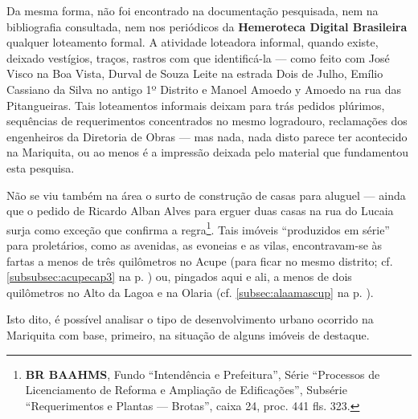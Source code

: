 
Da mesma forma, não foi encontrado na documentação pesquisada, nem na bibliografia consultada, nem nos periódicos da \textbf{Hemeroteca Digital Brasileira} qualquer loteamento formal. A atividade loteadora informal, quando existe, deixado vestígios, traços, rastros com que identificá-la --- como feito com José Visco na Boa Vista, Durval de Souza Leite na estrada Dois de Julho, Emílio Cassiano da Silva no antigo 1º Distrito e Manoel Amoedo y Amoedo na rua das Pitangueiras. Tais loteamentos informais deixam para trás pedidos plúrimos, sequências de requerimentos concentrados no mesmo logradouro, reclamações dos engenheiros da Diretoria de Obras --- mas nada, nada disto parece ter acontecido na Mariquita, ou ao menos é a impressão deixada pelo material que fundamentou esta pesquisa. 


Não se viu também na área o surto de construção de casas para aluguel --- ainda que o pedido de Ricardo Alban Alves para erguer duas casas na rua do Lucaia surja como exceção que confirma a regra\footnote{\textbf{BR BAAHMS}, Fundo ``Intendência e Prefeitura'', Série ``Processos de Licenciamento de Reforma e Ampliação de Edificações'', Subsérie ``Requerimentos e Plantas --- Brotas'', caixa 24, proc. 441 fls. 323.}. Tais imóveis ``produzidos em série'' para proletários, como as avenidas, as evoneias e as vilas, encontravam-se às fartas a menos de três quilômetros no Acupe (para ficar no mesmo distrito; cf. \autoref{subsubsec:acupecap3} na p. \pageref{subsubsec:acupecap3}) ou, pingados aqui e ali, a menos de dois quilômetros no Alto da Lagoa e na Olaria (cf. \autoref{subsec:alaamascup} na p. \pageref{subsec:alaamascup}). 


Isto dito, é possível analisar o tipo de desenvolvimento urbano ocorrido na Mariquita com base, primeiro, na situação de alguns imóveis de destaque.

